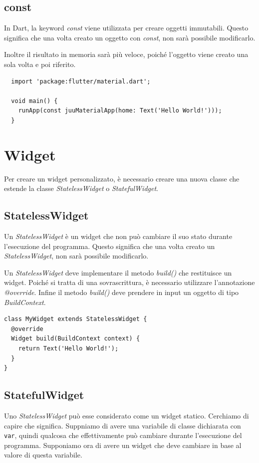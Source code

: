 \documentclass[12pt]{article}
\begin{document}
\subsection{const}
In Dart, la keyword \textit{const} viene utilizzata per creare
oggetti immutabili. Questo significa che una volta creato un oggetto con \textit{const}, non sarà possibile modificarlo.

Inoltre il risultato in memoria sarà più veloce, poiché l'oggetto
viene creato una sola volta e poi riferito.

\begin{verbatim}
  import 'package:flutter/material.dart';

  void main() {
    runApp(const juuMaterialApp(home: Text('Hello World!')));
  }
\end{verbatim}

\section{Widget}
Per creare un widget personalizzato, è necessario creare una nuova classe
che estende la classe \textit{StatelessWidget} o \textit{StatefulWidget}.

\subsection{StatelessWidget}
Un \textit{StatelessWidget} è un widget che non può cambiare il suo stato
durante l'esecuzione del programma. Questo significa che una volta creato
un \textit{StatelessWidget}, non sarà possibile modificarlo.

Un \textit{StatelessWidget} deve implementare il metodo \textit{build()} che
restituisce un widget. Poiché si tratta di
una sovrascrittura, è necessario utilizzare l'annotazione \textit{@override}. Infine
il metodo \textit{build()} deve prendere in input un oggetto di tipo \textit{BuildContext}.
\begin{verbatim}
class MyWidget extends StatelessWidget {
  @override
  Widget build(BuildContext context) {
    return Text('Hello World!');
  }
}
\end{verbatim}



\subsection{StatefulWidget}
Uno \textit{StatelessWidget} può esse considerato come un widget statico. Cerchiamo di capire che significa.
Suppniamo di avere una variabile di classe dichiarata con \texttt{var}, quindi qualcosa che effettivamente può cambiare durante l'esecuzione del programma.
Supponiamo ora di avere un widget che deve cambiare in base al valore di questa variabile.
\end{document}
